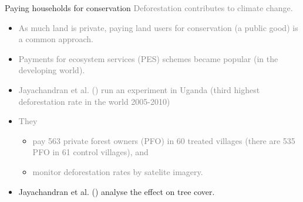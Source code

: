 \documentclass[aspectratio=169]{beamer}
\begin{document}
		\begin{frame}{Paying households for conservation}
			\textcolor<2->{gray}{Deforestation contributes to climate change.\\ \vspace*{.25cm}}
			\begin{itemize}
				\item<2-> \textcolor<3->{gray}{As much land is private, paying land users for conservation (a public good) is a common approach.}
				\item<3-> \textcolor<4->{gray}{Payments for ecosystem services (PES) schemes became popular (in the developing world).}
				\item<4-> \textcolor<5->{gray}{Jayachandran et al. (\cite*{Jayachandran2017}) run an experiment in Uganda (third highest deforestation rate in the world 2005-2010)}
				\item<5-> \textcolor<6->{gray}{They}
				\begin{itemize}
					\item \textcolor<6->{gray}{pay 563 private forest owners (PFO) in 60 treated villages (there are 535 PFO in 61 control villages), and}
					\item \textcolor<6->{gray}{monitor deforestation rates by satelite imagery.}
				\end{itemize}
				\item<6-> Jayachandran et al. (\cite*{Jayachandran2017}) analyse the effect on tree cover.
			\end{itemize}
		\end{frame}
\end{document}

